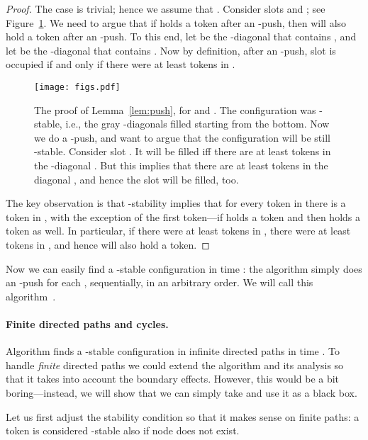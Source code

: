 \begin{proof}
The case  is trivial; hence we assume that . Consider slots  and ; see Figure~\ref{fig:pushlemma}. We need to argue that if  holds a token after an -push, then  will also hold a token after an -push. To this end, let  be the -diagonal that contains , and let  be the -diagonal that contains . Now by definition, after an -push, slot  is occupied if and only if there were at least  tokens in .

\begin{figure}[ht]
    \centering
    \texttt{[image: figs.pdf]}
    \caption{The proof of Lemma~\ref{lem:push}, for  and . The configuration was -stable, i.e., the gray -diagonals filled starting from the bottom. Now we do a -push, and want to argue that the configuration will be still -stable. Consider slot . It will be filled iff there are at least  tokens in the -diagonal . But this implies that there are at least  tokens in the diagonal , and hence the slot  will be filled, too.}\label{fig:pushlemma}
\end{figure}

The key observation is that -stability implies that for every token in  there is a token in , with the exception of the first token---if  holds a token and  then  holds a token as well. In particular, if there were at least  tokens in , there were at least  tokens in , and hence  will also hold a token.
\end{proof}

Now we can easily find a -stable configuration in time : the algorithm simply does an -push for each , sequentially, in an arbitrary order. We will call this algorithm~.


\paragraph{Finite directed paths and cycles.}

Algorithm  finds a -stable configuration in infinite directed paths in time . To handle \emph{finite} directed paths we could extend the algorithm and its analysis so that it takes into account the boundary effects. However, this would be a bit boring---instead, we will show that we can simply take  and use it as a black box.

Let us first adjust the stability condition so that it makes sense on finite paths: a token  is considered -stable also if node  does not exist.

